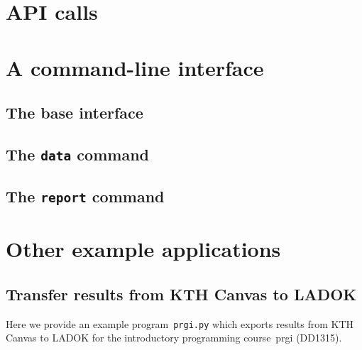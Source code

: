 \documentclass[a4paper]{report}
\begin{document}
\part{API calls}





\part{A command-line interface}

\chapter{The base interface}



\chapter{The \texttt{data} command}



\chapter{The \texttt{report} command}





\part{Other example applications}

\chapter{Transfer results from KTH Canvas to LADOK}

Here we provide an example program~\texttt{prgi.py} which exports results from KTH 
Canvas to LADOK for the introductory programming course~prgi (DD1315).




\printbibliography
\end{document}
